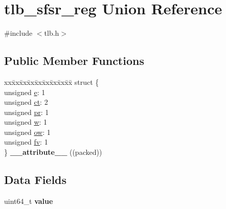 \hypertarget{uniontlb__sfsr__reg}{}\section{tlb\+\_\+sfsr\+\_\+reg Union Reference}
\label{uniontlb__sfsr__reg}


{\ttfamily \#include $<$tlb.\+h$>$}

\subsection*{Public Member Functions}
\begin{DoxyCompactItemize}
\item 
\mbox{\label{uniontlb__sfsr__reg_a994f4ccfcad2c13ebbda1b2d3b8d5052}} 
\begin{tabbing}
xx\=xx\=xx\=xx\=xx\=xx\=xx\=xx\=xx\=\kill
struct \{\\
\>unsigned \mbox{\hyperlink{uniontlb__sfsr__reg_a25417c72182f91c7f360589b6e5b9138}{e}}: 1\\
\>unsigned \mbox{\hyperlink{uniontlb__sfsr__reg_ad844ff82050858e18dd8f55476403a59}{ct}}: 2\\
\>unsigned \mbox{\hyperlink{uniontlb__sfsr__reg_aa0d1ed8c97e41378ebe60a9a3f5ee731}{pr}}: 1\\
\>unsigned \mbox{\hyperlink{uniontlb__sfsr__reg_a20156a31b35acc5f0a95f0dca068642b}{w}}: 1\\
\>unsigned \mbox{\hyperlink{uniontlb__sfsr__reg_a0376aecfe0bb82af05c2600c2e0adf78}{ow}}: 1\\
\>unsigned \mbox{\hyperlink{uniontlb__sfsr__reg_a8554ab373e7cd775d0d3a941e885d21a}{fv}}: 1\\
\} {\bfseries \_\_attribute\_\_} ((packed))\\

\end{tabbing}\end{DoxyCompactItemize}
\subsection*{Data Fields}
\begin{DoxyCompactItemize}
\item 
\mbox{\label{uniontlb__sfsr__reg_ad32d45d4c39bff52c8a4e33df9851007}} 
uint64\+\_\+t {\bfseries value}
\end{DoxyCompactItemize}


